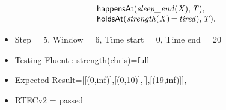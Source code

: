 \documentclass[8pt]{beamer}
\DeclareMathOperator{\val}{=}  %
\def \patsize {}
\def\happensAt{\textsf{\patsize happensAt}}
\def\holdsAt{\textsf{\patsize holdsAt}}
\newenvironment{mysplit}%
  {\arraycolsep 0pt \begin{array}{l}}%
  {\end{array}}
\begin{document}
\begin{frame}
\begin{minipage}{0.55\linewidth}
\begin{align*}
\begin{mysplit}
                \quad    \happensAt\mathit{(sleep\_end(X),T),}\\
                \quad    \holdsAt\mathit{(strength(X)\val tired),T).}\\
            \end{mysplit}
        \end{align*}
    \end{minipage}
    \begin{itemize}
        \item  Step = 5, Window = 6, Time start = 0, Time end = 20
        \item Testing Fluent :  strength(chris)=full
        \item Expected Result=[[(0,inf)],[(0,10)],[],[(19,inf)]],
        \item RTECv2 = passed
    \end{itemize}
\end{frame}
\end{document}
